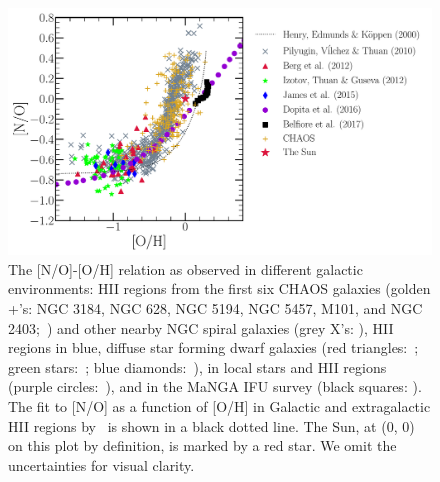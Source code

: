 \documentclass[ms.tex]{subfiles}
\begin{document}
\begin{figure} 
\centering 
\includegraphics[scale = 0.5]{no_oh_observed.pdf} 
\caption{
The [N/O]-[O/H] relation as observed in different galactic environments:
HII regions from the first six CHAOS galaxies (golden +'s: NGC 3184, NGC 628,
NGC 5194, NGC 5457, M101, and NGC 2403;~\citealp{Berg2020, Skillman2020,
Rogers2021}) and other nearby NGC spiral galaxies (grey X's:
\citealp*{Pilyugin2010}), HII regions in blue, diffuse star forming dwarf
galaxies (red triangles:~\citealp{Berg2012}; green stars:~\citealp*{Izotov2012};
blue diamonds:~\citealp{James2015}), in local stars and HII regions (purple
circles:~\citealp{Dopita2016}), and in the MaNGA IFU survey (black squares:
\citealp{Belfiore2017}).
The fit to [N/O] as a function of [O/H] in Galactic and extragalactic HII 
regions by~\citet*{Henry2000} is shown in a black dotted line. 
The Sun, at (0, 0) on this plot by definition, is marked by a red star. 
We omit the uncertainties for visual clarity. 
} 
\label{fig:no_oh_observed} 
\end{figure} 
\end{document}
